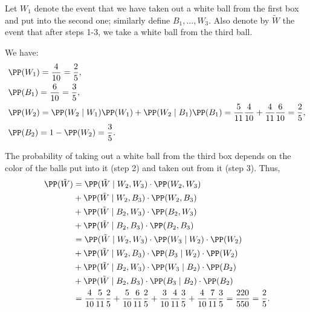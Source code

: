 \begin{solution} %
Let $W_1$ denote the event that we have taken out a white ball from the first box and put into the second one; similarly define $B_1, \dots, W_3$. Also denote by $\tilde{W}$ the event that after steps 1-3, we take a white ball from the third ball.

We have:
\begin{align*}
    &\PP(W_1) = \dfrac{4}{10}= \dfrac{2}{5},\\
    &\PP(B_1) = \dfrac{6}{10}= \dfrac{3}{5},\\
    &\PP(W_2) = \PP(W_2\mid W_1)\PP(W_1)+\PP(W_2\mid B_1)\PP(B_1)=\dfrac{5}{11}\dfrac{4}{10}+\dfrac{4}{11}\dfrac{6}{10}=\dfrac{2}{5},\\
    &\PP(B_2) =1-\PP(W_2)=\dfrac{3}{5}.\\
\end{align*}

The probability of taking out a white ball from the third box depends on the color of the balls put into it (step 2) and taken out from it (step 3). Thus, 
\begin{align*}
     \PP(\tilde{W}) &= \PP(\tilde{W}\mid W_2, W_3)\cdot \PP( W_2, W_3) \\&+
     \PP(\tilde{W}\mid W_2, B_3)\cdot \PP( W_2, B_3) \\&+
     \PP(\tilde{W}\mid B_2, W_3)\cdot \PP( B_2, W_3) \\&+
     \PP(\tilde{W}\mid B_2, B_3)\cdot \PP( B_2, B_3) \\&=
     \PP(\tilde{W}\mid W_2, W_3)\cdot \PP(W_3\mid W_2) \cdot \PP( W_2) \\&+
     \PP(\tilde{W}\mid W_2, B_3)\cdot \PP(B_3\mid W_2) \cdot \PP( W_2)\\&+
     \PP(\tilde{W}\mid B_2, W_3)\cdot \PP(W_3\mid B_2) \cdot \PP( B_2) \\&+
     \PP(\tilde{W}\mid B_2, B_3)\cdot \PP(B_3\mid B_2) \cdot \PP( B_2) \\&=     
\dfrac{4}{10}\dfrac{5}{11}\dfrac{2}{5} +
\dfrac{5}{10}\dfrac{6}{11}\dfrac{2}{5} +
\dfrac{3}{10}\dfrac{4}{11}\dfrac{3}{5} +
\dfrac{4}{10}\dfrac{7}{11}\dfrac{3}{5} =\dfrac{220}{550} = \dfrac{2}{5}.
\end{align*}
\end{solution}

